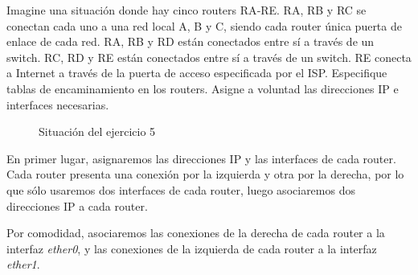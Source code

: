 \begin{ejercicio}
    Imagine una situación donde hay cinco routers RA‐RE\@. RA, RB y RC se conectan cada uno a una red local A, B y C, siendo cada router única puerta de enlace de cada red. RA, RB y RD están conectados entre sí a través de un switch. RC, RD y RE están conectados entre sí a través de un switch. RE conecta a Internet a través de la puerta de acceso especificada por el ISP\@. Especifique tablas de encaminamiento en los routers. Asigne a voluntad las direcciones IP e interfaces necesarias.
    \begin{figure}[H]
    \centering
    \caption{Situación del ejercicio 5}
    \end{figure}

    En primer lugar, asignaremos las direcciones IP y las interfaces de cada router. Cada router presenta una conexión por la izquierda y otra por la derecha, por lo que sólo usaremos dos interfaces de cada router, luego asociaremos dos direcciones IP a cada router.

    Por comodidad, asociaremos las conexiones de la derecha de cada router a la interfaz \textit{ether0}, y las conexiones de la izquierda de cada router a la interfaz \textit{ether1}.


\end{ejercicio}
